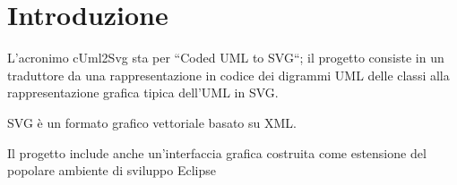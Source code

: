 \chapter{Introduzione}

L'acronimo cUml2Svg sta per ``Coded UML to SVG``; 
il progetto consiste in un traduttore da una rappresentazione
in codice dei digrammi UML delle classi alla rappresentazione grafica
tipica dell'UML in SVG.

SVG è un formato grafico vettoriale basato su XML.

Il progetto include anche un'interfaccia grafica costruita come estensione del
popolare ambiente di sviluppo Eclipse~\cite{eclipse_website}

